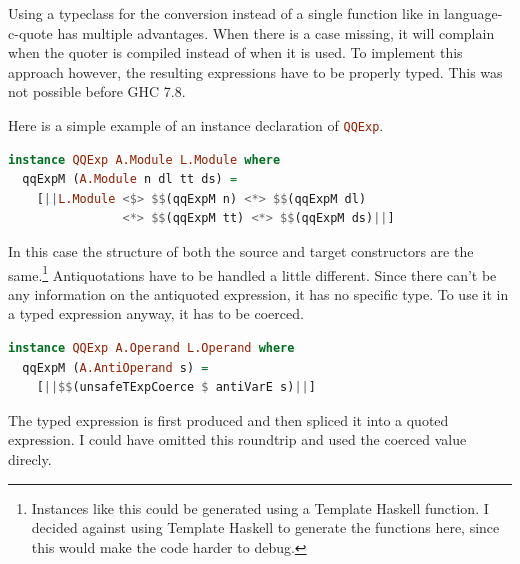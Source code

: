 \documentclass[a4paper,bibliography=totocnumbered,parskip,headsepline]{scrbook}
\begin{document}
Using a typeclass for the conversion instead of a single function like in language-c-quote has multiple advantages.
When there is a case missing, it will complain when the quoter is compiled instead of when it is used.
To implement this approach however, the resulting expressions have to be properly typed.
This was not possible before GHC 7.8.

Here is a simple example of an instance declaration of \lstinline[language=haskell]!QQExp!.
\begin{lstlisting}[language=haskell]
instance QQExp A.Module L.Module where
  qqExpM (A.Module n dl tt ds) =
    [||L.Module <$> $$(qqExpM n) <*> $$(qqExpM dl)
                <*> $$(qqExpM tt) <*> $$(qqExpM ds)||]
\end{lstlisting}
In this case the structure of both the source and target constructors are the same.\footnote{Instances like this could be generated using a Template Haskell function.
I decided against using Template Haskell to generate the functions here, since this would make the code harder to debug.}
Antiquotations have to be handled a little different.
Since there can't be any information on the antiquoted expression, it has no specific type.
To use it in a typed expression anyway, it has to be coerced.
\begin{lstlisting}[language=haskell]
instance QQExp A.Operand L.Operand where
  qqExpM (A.AntiOperand s) =
    [||$$(unsafeTExpCoerce $ antiVarE s)||]
\end{lstlisting}
The typed expression is first produced and then spliced it into a quoted expression.
I could have omitted this roundtrip and used the coerced value direcly.
\end{document}
